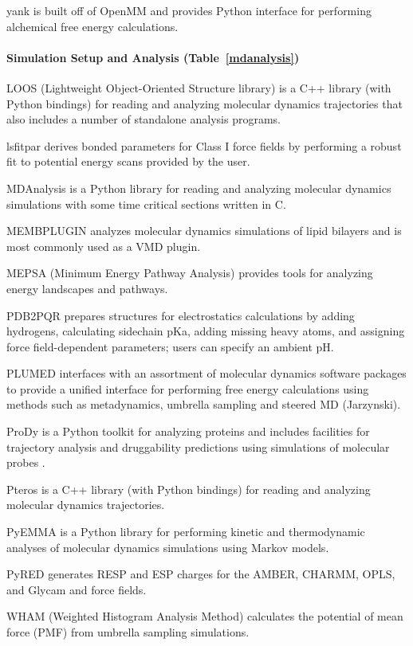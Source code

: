 yank is built off of OpenMM and provides Python interface for performing alchemical free energy calculations.

\paragraph{Simulation Setup and Analysis (Table~\ref{mdanalysis})}

LOOS (Lightweight Object-Oriented Structure library) \cite{Romo_2014} is a C++ library (with Python bindings) for reading and analyzing molecular dynamics trajectories that also includes a number of standalone analysis programs.

lsfitpar \cite{Vanommeslaeghe_2015} derives bonded parameters for Class I force fields by performing a robust fit to potential energy scans provided by the user.

MDAnalysis  \cite{Michaud_Agrawal_2011} is a Python library for reading and analyzing molecular dynamics simulations with some time critical sections written in C.

MEMBPLUGIN \cite{Guixa-Gonzalez_2014} analyzes molecular dynamics simulations of lipid bilayers and is most commonly used as a VMD plugin.

MEPSA (Minimum Energy Pathway Analysis) \cite{Marcos_Alcalde_2015} provides tools for analyzing energy landscapes and pathways.

PDB2PQR \cite{Dolinsky_2007} prepares structures for electrostatics calculations by adding hydrogens, calculating sidechain pKa, adding missing heavy atoms, and assigning force field-dependent parameters; users can specify an ambient pH.

PLUMED \cite{Tribello_2014} interfaces with an assortment of molecular dynamics software packages to provide a unified interface for performing free energy calculations using methods such as metadynamics, umbrella sampling and steered MD (Jarzynski).

ProDy \cite{Bakan_2011} is a Python toolkit for analyzing proteins and includes facilities for trajectory analysis and druggability predictions using simulations of molecular probes \cite{Bakan_2012}.

Pteros \cite{Yesylevskyy_2015} is a C++ library (with Python bindings) for reading and analyzing molecular dynamics trajectories.

PyEMMA \cite{Scherer_2015} is a Python library for performing kinetic and thermodynamic analyses of molecular dynamics simulations using Markov models. 

PyRED \cite{Dupradeau_2010} generates RESP and ESP charges for the AMBER, CHARMM, OPLS, and Glycam and force fields.

WHAM (Weighted Histogram Analysis Method) calculates the potential of mean force (PMF) from umbrella sampling simulations.

